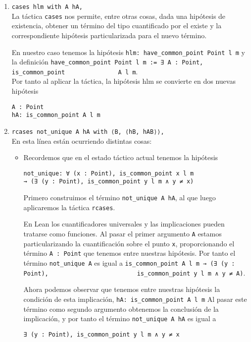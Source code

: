 \begin{enumerate}[label=L.\arabic*, topsep=0mm]
	\item \lstinline{cases hlm with A hA,}\\[.5em] La táctica \lstinline{cases} nos
	      permite, entre otras cosas, dada una hipótesis de existencia, obtener un
	      término del tipo cuantificado por el existe y la correspondiente hipótesis
	      particularizada para el nuevo término.

	      En nuestro caso tenemos la hipótesis \lstinline{hlm: have_common_point Point l m} y la definición
	      \lstinline{have_common_point Point l m := ∃ A : Point, is_common_point
		      A l m}.\\
	      Por tanto al aplicar la táctica, la hipótesis hlm se convierte en dos
	      nuevas hipótesis
	      \begin{lstlisting}
A : Point 
hA: is_common_point A l m
\end{lstlisting}

	\item \lstinline{rcases not_unique A hA with ⟨B, ⟨hB, hAB⟩⟩,}\\[.5em] En esta línea
	      están ocurriendo distintas cosas:
	      \begin{itemize}
		      \item Recordemos que en el estado táctico actual tenemos la hipótesis
		            \begin{lstlisting}
not_unique: ∀ (x : Point), is_common_point x l m 
→ (∃ (y : Point), is_common_point y l m ∧ y ≠ x) 
\end{lstlisting}

		            Primero construimos el término \lstinline{not_unique A hA},
		            al que luego aplicaremos la táctica \lstinline{rcases}.

		            En Lean los cuantificadores universales y las implicaciones pueden
		            tratarse como funciones. Al pasar el primer argumento \lstinline{A}
		            estamos particularizando la cuantificación sobre el punto
		            \lstinline{x}, proporcionando el término \lstinline{A : Point} que
		            tenemos entre nuestras hipótesis. Por tanto el término
		            \lstinline{not_unique A} es igual a
		            \lstinline{is_common_point A l m → (∃ (y : Point),
			            is_common_point y l m ∧ y ≠ A)}.

		            Ahora podemos observar que tenemos entre nuestras hipótesis la
		            condición de esta implicación, \lstinline{hA: is_common_point A l m}
		            Al pasar este término como segundo argumento obtenemos la conclusión
		            de la implicación, y por tanto el término
		            \lstinline{not_unique A hA} es igual a
		            \begin{lstlisting}
∃ (y : Point), is_common_point y l m ∧ y ≠ x
\end{lstlisting}


\end{itemize}
\end{enumerate}
